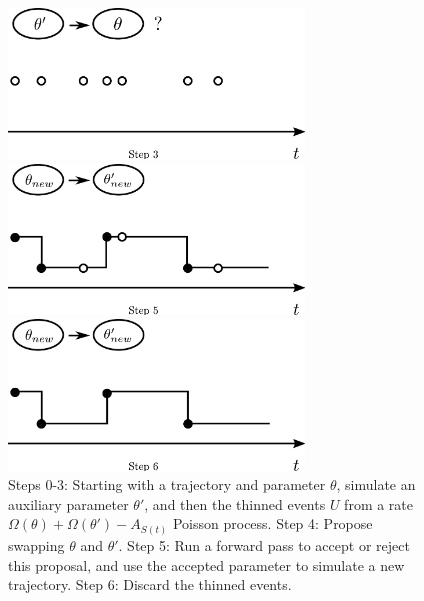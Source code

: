 \begin{figure}[H]
\begin{minipage}[hp]{0.45\linewidth}
  \centering
    \includegraphics [width=0.70\textwidth, angle=0]{figs/plot3.pdf}
    \vspace{-0 in}
  \end{minipage}
  \begin{minipage}[hp]{0.45\linewidth}
  \centering
    \includegraphics [width=0.70\textwidth, angle=0]{figs/plot5.pdf}
    \vspace{-0 in}
  \end{minipage}
  \begin{minipage}[hp]{0.45\linewidth}
  \centering
    \includegraphics [width=0.70\textwidth, angle=0]{figs/plot6.pdf}
    \vspace{-0 in}
  \end{minipage}
    \caption{Steps 0-3: Starting with a trajectory and parameter $\theta$,
      simulate an auxiliary parameter $\theta'$, and then the thinned events
      $U$ from a rate $\Omega(\theta) + \Omega(\theta') - A_{S(t)}$ Poisson
      process. Step 4: Propose swapping $\theta$ and $\theta'$. Step 5:
      Run a forward pass to accept or reject this proposal, and use the accepted
    parameter to simulate a new trajectory. Step 6: Discard the thinned events.} 
   \label{fig:MH_improved}

  \end{figure}

